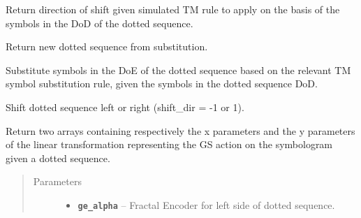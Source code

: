 \documentclass[letterpaper,10pt,english]{sphinxmanual}
\begin{document}
\begin{fulllineitems}
\begin{fulllineitems}
\begin{quote}
\begin{description}
\end{description}\end{quote}

\end{fulllineitems}


\begin{fulllineitems}
\label{symdyn_docs:symdyn.TMGeneralizedShift.F}
Return direction of shift given simulated TM rule to apply on the
basis of the symbols in the DoD of the dotted sequence.

\end{fulllineitems}


\begin{fulllineitems}
\label{symdyn_docs:symdyn.TMGeneralizedShift.substitution}
Return new dotted sequence from substitution.

Substitute symbols in the DoE of the dotted sequence based on the
relevant TM symbol substitution rule, given the symbols in the
dotted sequence DoD.

\end{fulllineitems}


\begin{fulllineitems}
\label{symdyn_docs:symdyn.TMGeneralizedShift.shift}
Shift dotted sequence left or right (shift\_dir = -1 or 1).

\end{fulllineitems}


\begin{fulllineitems}
\label{symdyn_docs:symdyn.TMGeneralizedShift.lintransf_params}
Return two arrays containing respectively the x parameters and the
y parameters of the linear transformation representing the GS
action on the symbologram given a dotted sequence.
\begin{quote}\begin{description}
\item[{Parameters}] \leavevmode\begin{itemize}
\item {} 
\textbf{\texttt{ge\_alpha}} -- Fractal Encoder for left side of dotted sequence.


\end{itemize}
\end{description}
\end{quote}
\end{fulllineitems}
\end{fulllineitems}
\end{document}
